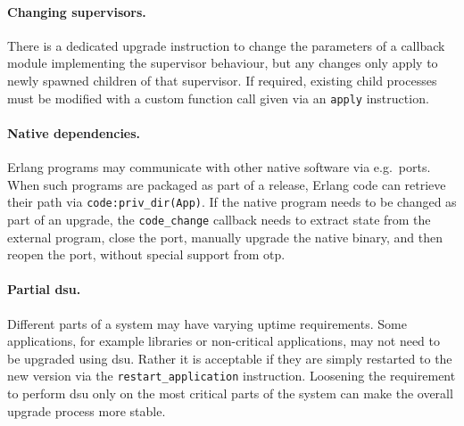 \paragraph{Changing supervisors.}
There is a dedicated upgrade instruction to change the parameters of a callback module implementing the supervisor behaviour, but any changes only apply to newly spawned children of that supervisor. If required, existing child processes must be modified with a custom function call given via an \lstinline|apply| instruction.

\paragraph{Native dependencies.}
Erlang programs may communicate with other native software via e.g.~ports. When such programs are packaged as part of a release, Erlang code can retrieve their path via \lstinline|code:priv_dir(App)|. If the native program needs to be changed as part of an upgrade, the \lstinline|code_change| callback needs to extract state from the external program, close the port, manually upgrade the native binary, and then reopen the port, without special support from \acrshort{otp}.

\paragraph{Partial \acrshort{dsu}.}
Different parts of a system may have varying uptime requirements. Some applications, for example libraries or non-critical applications, may not need to be upgraded using \acrshort{dsu}. Rather it is acceptable if they are simply restarted to the new version via the \lstinline|restart_application| instruction. Loosening the requirement to perform \acrshort{dsu} only on the most critical parts of the system can make the overall upgrade process more stable.
